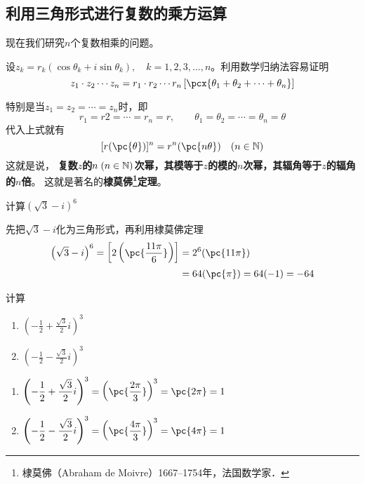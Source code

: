 \subsection{利用三角形式进行复数的乘方运算}

现在我们研究$n$个复数相乘的问题。

设$z_k=r_k(\cos\theta_k+i\sin\theta_k),\quad k=1,2,3,\ldots,n$。利用数学归纳法容易证明
\[z_1\cdot z_2\cdots z_n=r_1\cdot r_2\cdots r_n\left[\pcx{\theta_1+\theta_2+\cdots+\theta_n}\right]\]

特别是当$z_1= z_2=\cdots= z_n$时，即
\[r_1=r2=\cdots=r_n=r,\qquad \theta_1=\theta_2=\cdots=\theta_n=\theta\]
代入上式就有
\[[r(\pc{\theta})]^n=r^n(\pc{n\theta})\quad (n\in\N)\]
这就是说，
\textbf{复数$z$的$n\; (n\in\mathbb{N})$次幂，其模等于$z$的模的$n$次幂，其辐角等于$z$的辐角的$n$倍}。
这就是著名的\textbf{棣莫佛\footnote{棣莫佛（Abraham de Moivre）1667--1754年，法国数学家．}定理}。

\begin{example}
计算$\left(\sqrt{3}-i\right)^6$
\end{example}

\begin{solution}
先把$\sqrt{3}-i$化为三角形式，再利用棣莫佛定理
\[\begin{split}
\left(\sqrt{3}-i\right)^6=\left[2\left(\pc{\frac{11\pi}{6}}\right)\right]&=2^6(\pc{11\pi})\\
&=64(\pc{\pi})=64(-1)=-64
\end{split}\]
\end{solution}


\begin{example}
    计算
\begin{multicols}{2}
\begin{enumerate}[(1)]
    \item $\left(-\frac{1}{2}+\frac{\sqrt{3}}{2}i\right)^3$
    \item $\left(-\frac{1}{2}-\frac{\sqrt{3}}{2}i\right)^3$
\end{enumerate}
\end{multicols}
\end{example}

\begin{solution}
\begin{enumerate}[(1)]
    \item $\left(-\frac{1}{2}+\frac{\sqrt{3}}{2}i\right)^3=\left(\pc{\frac{2\pi}{3}}\right)^3=\pc{2\pi}=1$
    \item $\left(-\frac{1}{2}-\frac{\sqrt{3}}{2}i\right)^3=\left(\pc{\frac{4\pi}{3}}\right)^3=\pc{4\pi}=1$
\end{enumerate}
\end{solution}

